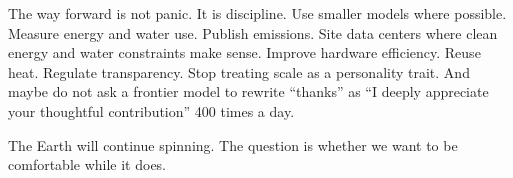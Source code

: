 \documentclass[12pt,oneside]{book}
\begin{document}
The way forward is not panic. It is discipline. Use smaller models where possible. Measure energy and water use. Publish emissions. Site data centers where clean energy and water constraints make sense. Improve hardware efficiency. Reuse heat. Regulate transparency. Stop treating scale as a personality trait. And maybe do not ask a frontier model to rewrite ``thanks'' as ``I deeply appreciate your thoughtful contribution'' 400 times a day.

The Earth will continue spinning. The question is whether we want to be comfortable while it does.

\backmatter
\printbibliography[heading=bibintoc,title={Bibliography}]
\end{document}
